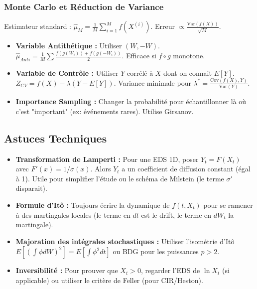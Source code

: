 \documentclass[a4paper,11pt]{article}
\begin{document}
\subsubsection{Monte Carlo et Réduction de Variance}
Estimateur standard : $\hat{\mu}_M = \frac{1}{M} \sum_{i=1}^M f(X^{(i)})$. Erreur $\propto \frac{\text{Var}(f(X))}{\sqrt{M}}$.
\begin{itemize}
    \item \textbf{Variable Antithétique :} Utiliser $(W, -W)$.
    $\hat{\mu}_{Anti} = \frac{1}{M} \sum \frac{f(g(W_i)) + f(g(-W_i))}{2}$. Efficace si $f \circ g$ monotone.
    \item \textbf{Variable de Contrôle :} Utiliser $Y$ corrélé à $X$ dont on connait $E[Y]$.
    $Z_{CV} = f(X) - \lambda (Y - E[Y])$. Variance minimale pour $\lambda^* = \frac{\text{Cov}(f(X), Y)}{\text{Var}(Y)}$.
    \item \textbf{Importance Sampling :} Changer la probabilité pour échantillonner là où c'est "important" (ex: événements rares). Utilise Girsanov.
\end{itemize}

\subsection{Astuces Techniques}
\begin{itemize}
    \item \textbf{Transformation de Lamperti :} Pour une EDS 1D, poser $Y_t = F(X_t)$ avec $F'(x) = 1/\sigma(x)$. Alors $Y_t$ a un coefficient de diffusion constant (égal à 1). Utile pour simplifier l'étude ou le schéma de Milstein (le terme $\sigma'$ disparait).
    \item \textbf{Formule d'Itô :} Toujours écrire la dynamique de $f(t, X_t)$ pour se ramener à des martingales locales (le terme en $dt$ est le drift, le terme en $dW_t$ la martingale).
    \item \textbf{Majoration des intégrales stochastiques :} Utiliser l'isométrie d'Itô $E[(\int \phi dW)^2] = E[\int \phi^2 dt]$ ou BDG pour les puissances $p > 2$.
    \item \textbf{Inversibilité :} Pour prouver que $X_t > 0$, regarder l'EDS de $\ln X_t$ (si applicable) ou utiliser le critère de Feller (pour CIR/Heston).
\end{itemize}

\newpage

\end{document}

